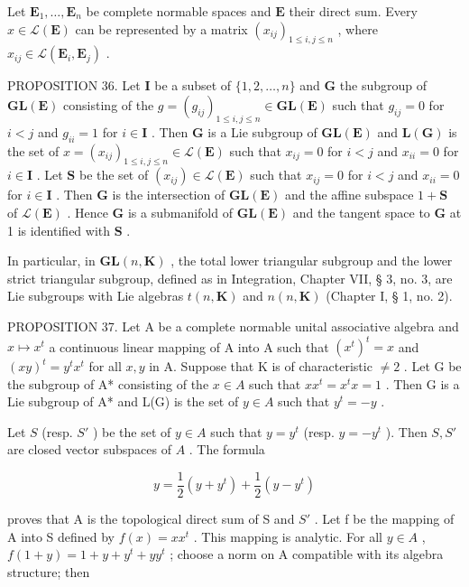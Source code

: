 Let \(\mathbf{E}_1, \ldots, \mathbf{E}_n\) be complete normable spaces and \(\mathbf{E}\) their direct sum. Every \(x \in \mathcal{L}(\mathbf{E})\) can be represented by a matrix \((x_{ij})_{1 \leqslant i, j \leqslant n}\) , where \(x_{ij} \in \mathcal{L}(\mathbf{E}_i, \mathbf{E}_j)\) .

PROPOSITION 36. Let \(\mathbf{I}\) be a subset of \(\{1,2,\ldots,n\}\) and \(\mathbf{G}\) the subgroup of \(\mathbf{GL}(\mathbf{E})\) consisting of the \(g = (g_{ij})_{1\leqslant i,j\leqslant n}\in \mathbf{GL}(\mathbf{E})\) such that \(g_{ij} = 0\) for \(i < j\) and \(g_{ii} = 1\) for \(i\in \mathbf{I}\) . Then \(\mathbf{G}\) is a Lie subgroup of \(\mathbf{GL}(\mathbf{E})\) and \(\mathbf{L}(\mathbf{G})\) is the set of \(x = (x_{ij})_{1\leqslant i,j\leqslant n}\in \mathcal{L}(\mathbf{E})\) such that \(x_{ij} = 0\) for \(i < j\) and \(x_{ii} = 0\) for \(i\in \mathbf{I}\) . Let \(\mathbf{S}\) be the set of \((x_{ij})\in \mathcal{L}(\mathbf{E})\) such that \(x_{ij} = 0\) for \(i < j\) and \(x_{ii} = 0\) for \(i\in \mathbf{I}\) . Then \(\mathbf{G}\) is the intersection of \(\mathbf{GL}(\mathbf{E})\) and the affine subspace \(1 + \mathbf{S}\) of \(\mathcal{L}(\mathbf{E})\) . Hence \(\mathbf{G}\) is a submanifold of \(\mathbf{GL}(\mathbf{E})\) and the tangent space to \(\mathbf{G}\) at 1 is identified with \(\mathbf{S}\) .

In particular, in \(\mathbf{GL}(n,\mathbf{K})\) , the total lower triangular subgroup and the lower strict triangular subgroup, defined as in Integration, Chapter VII, § 3, no. 3, are Lie subgroups with Lie algebras \(t(n,\mathbf{K})\) and \(n(n,\mathbf{K})\) (Chapter I, § 1, no. 2).

PROPOSITION 37. Let A be a complete normable unital associative algebra and \(x \mapsto x^t\) a continuous linear mapping of A into A such that \((x^t)^t = x\) and \((xy)^t = y^t x^t\) for all \(x, y\) in A. Suppose that K is of characteristic \(\neq 2\) . Let G be the subgroup of A* consisting of the \(x \in A\) such that \(xx^t = x^t x = 1\) . Then G is a Lie subgroup of A* and L(G) is the set of \(y \in A\) such that \(y^t = -y\) .

Let \(S\) (resp. \(S'\) ) be the set of \(y \in A\) such that \(y = y^t\) (resp. \(y = -y^t\) ). Then \(S, S'\) are closed vector subspaces of \(A\) . The formula

\[
y = \frac {1}{2} (y + y ^ {t}) + \frac {1}{2} (y - y ^ {t})
\]

proves that A is the topological direct sum of S and \(S'\) . Let f be the mapping of A into S defined by \(f(x) = xx^{t}\) . This mapping is analytic. For all \(y \in A\) , \(f(1 + y) = 1 + y + y^{t} + yy^{t}\) ; choose a norm on A compatible with its algebra structure; then

